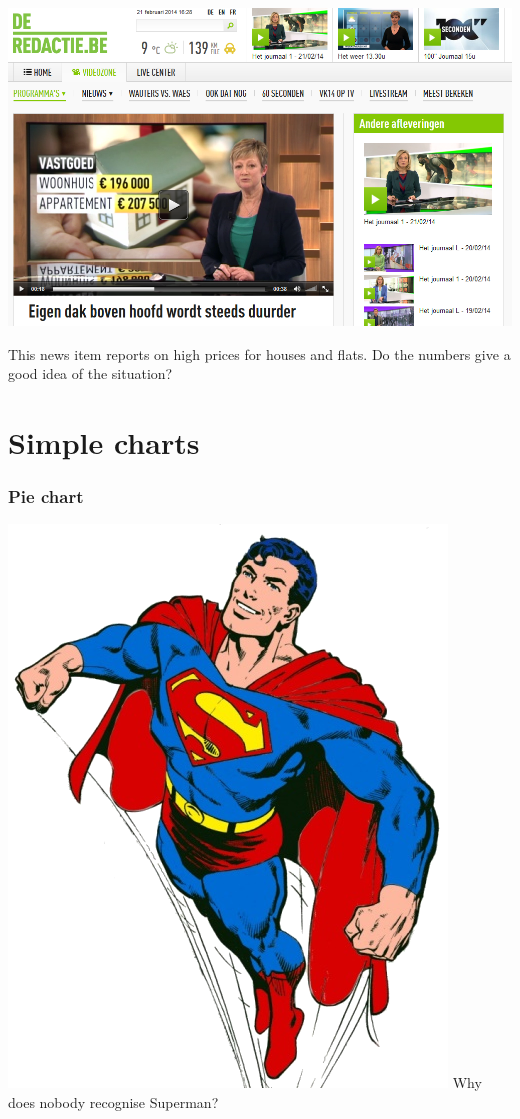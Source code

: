 \documentclass{beamer}
\begin{document}
\begin{frame}[plain]

  \centering
  \includegraphics[width=.9\textwidth]{img/les2-01}

  This news item reports on high prices for houses and flats. Do the numbers give a good idea of the situation?
\end{frame}

\section{Simple charts}
\sectionframelogo{}

\begin{frame}
  \frametitle{Pie chart}

  \centering
  \includegraphics[width=.8cm]{img/les2-hero-3}
  Why does nobody recognise Superman?

\end{frame}
\end{document}
